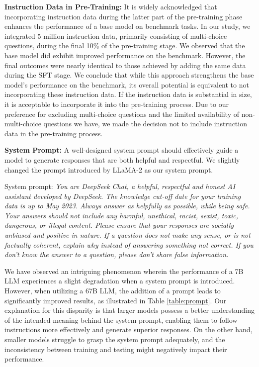 \textbf{Instruction Data in Pre-Training:} It is widely acknowledged that incorporating instruction data during the latter part of the pre-training phase enhances the performance of a base model on benchmark tasks. In our study, we integrated 5 million instruction data, primarily consisting of multi-choice questions, during the final 10\% of the pre-training stage. We observed that the base model did exhibit improved performance on the benchmark. However, the final outcomes were nearly identical to those achieved by adding the same data during the SFT stage. We conclude that while this approach strengthens the base model's performance on the benchmark, its overall potential is equivalent to not incorporating these instruction data. If the instruction data is substantial in size, it is acceptable to incorporate it into the pre-training process. Due to our preference for excluding multi-choice questions and the limited availability of non-multi-choice questions we have, we made the decision not to include instruction data in the pre-training process. 

\textbf{System Prompt:} A well-designed system prompt should effectively guide a model to generate responses that are both helpful and respectful. We slightly changed the prompt introduced by LLaMA-2 as our system prompt. 

System prompt: \textit{You are DeepSeek Chat, a helpful, respectful and honest AI assistant developed by DeepSeek. The knowledge cut-off date for your training data is up to May 2023. Always answer as helpfully as possible, while being safe. Your answers should not include any harmful, unethical, racist, sexist, toxic, dangerous, or illegal content. Please ensure that your responses are socially unbiased and positive in nature. If a question does not make any sense, or is not factually coherent, explain why instead of answering something not correct. If you don’t know the answer to a question, please don’t share false information.}  

We have observed an intriguing phenomenon wherein the performance of a 7B LLM experiences a slight degradation when a system prompt is introduced. However, when utilizing a 67B LLM, the addition of a prompt leads to significantly improved results, as illustrated in Table \ref{table:prompt}. Our explanation for this disparity is that larger models possess a better understanding of the intended meaning behind the system prompt, enabling them to follow instructions more effectively and generate superior responses. On the other hand, smaller models struggle to grasp the system prompt adequately, and the inconsistency between training and testing might negatively impact their performance.

